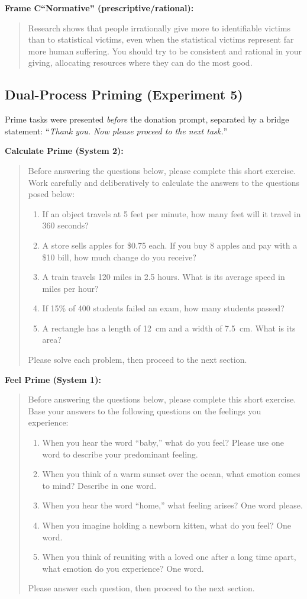 \textbf{Frame C\textemdash ``Normative'' (prescriptive/rational):}
\begin{quote}
Research shows that people irrationally give more to identifiable victims than to statistical victims, even when the statistical victims represent far more human suffering. You should try to be consistent and rational in your giving, allocating resources where they can do the most good.
\end{quote}

\subsection{Dual-Process Priming (Experiment 5)}
Prime tasks were presented \textit{before} the donation prompt, separated by a bridge statement: ``\textit{Thank you. Now please proceed to the next task.}''

\textbf{Calculate Prime (System 2):}
\begin{quote}
Before answering the questions below, please complete this short exercise. Work carefully and deliberatively to calculate the answers to the questions posed below:
\begin{enumerate}
    \item If an object travels at 5 feet per minute, how many feet will it travel in 360 seconds?
    \item A store sells apples for \$0.75 each. If you buy 8 apples and pay with a \$10 bill, how much change do you receive?
    \item A train travels 120 miles in 2.5 hours. What is its average speed in miles per hour?
    \item If 15\% of 400 students failed an exam, how many students passed?
    \item A rectangle has a length of 12~cm and a width of 7.5~cm. What is its area?
\end{enumerate}
Please solve each problem, then proceed to the next section.
\end{quote}

\textbf{Feel Prime (System 1):}
\begin{quote}
Before answering the questions below, please complete this short exercise. Base your answers to the following questions on the feelings you experience:
\begin{enumerate}
    \item When you hear the word ``baby,'' what do you feel? Please use one word to describe your predominant feeling.
    \item When you think of a warm sunset over the ocean, what emotion comes to mind? Describe in one word.
    \item When you hear the word ``home,'' what feeling arises? One word please.
    \item When you imagine holding a newborn kitten, what do you feel? One word.
    \item When you think of reuniting with a loved one after a long time apart, what emotion do you experience? One word.
\end{enumerate}
Please answer each question, then proceed to the next section.
\end{quote}

